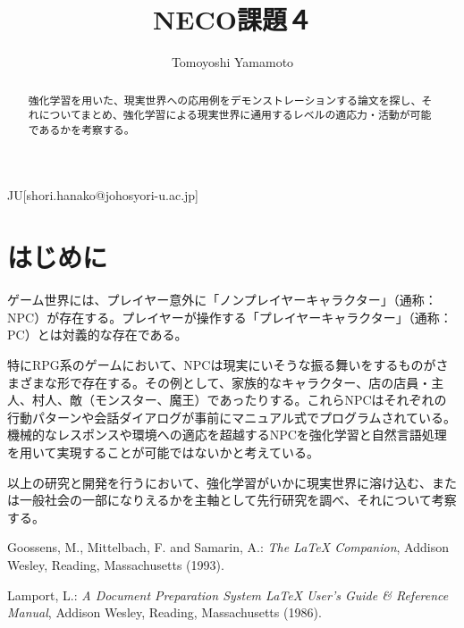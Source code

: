 \documentclass[english,preprint,JIP]{ipsj}
\begin{document}
\title{NECO課題４}


\author{Tomoyoshi Yamamoto}{JU}[shori.hanako@johosyori-u.ac.jp]


\begin{abstract}
強化学習を用いた、現実世界への応用例をデモンストレーションする論文を探し、それについてまとめ、強化学習による現実世界に通用するレベルの適応力・活動が可能であるかを考察する。
\end{abstract}

\maketitle

\section{はじめに}

ゲーム世界には、プレイヤー意外に「ノンプレイヤーキャラクター」（通称：NPC）が存在する。プレイヤーが操作する「プレイヤーキャラクター」（通称：PC）とは対義的な存在である。

特にRPG系のゲームにおいて、NPCは現実にいそうな振る舞いをするものがさまざまな形で存在する。その例として、家族的なキャラクター、店の店員・主人、村人、敵（モンスター、魔王）であったりする。これらNPCはそれぞれの行動パターンや会話ダイアログが事前にマニュアル式でプログラムされている。機械的なレスポンスや環境への適応を超越するNPCを強化学習と自然言語処理を用いて実現することが可能ではないかと考えている。

以上の研究と開発を行うにおいて、強化学習がいかに現実世界に溶け込む、または一般社会の一部になりえるかを主軸として先行研究を調べ、それについて考察する。


\begin{thebibliography}{99}
Goossens, M., Mittelbach, F. and Samarin, A.:
{\it The LaTeX Companion},
Addison Wesley, Reading, 
Massachusetts (1993).


Lamport, L.: 
{\it A Document Preparation System {\LaTeX} User's Guide \& Reference Manual}, 
Addison Wesley, Reading, Massachusetts (1986).
\end{thebibliography}
\end{document}
